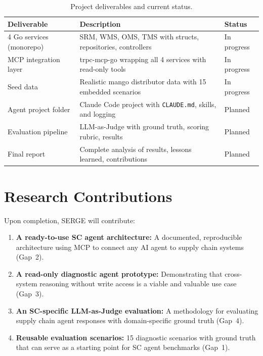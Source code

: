\documentclass[12pt,a4paper]{report}
\begin{document}
\begin{table}[H]
\centering\small
\caption{Project deliverables and current status.}
\begin{tabularx}{\textwidth}{@{} l X l @{}}
\toprule
\textbf{Deliverable} & \textbf{Description} & \textbf{Status} \\
\midrule
4 Go services (monorepo)  & SRM, WMS, OMS, TMS with structs, repositories, controllers & In progress \\
MCP integration layer      & trpc-mcp-go wrapping all 4 services with read-only tools   & In progress \\
Seed data                  & Realistic mango distributor data with 15 embedded scenarios & In progress \\
Agent project folder       & Claude Code project with \texttt{CLAUDE.md}, skills, and logging & Planned \\
Evaluation pipeline        & LLM-as-Judge with ground truth, scoring rubric, results     & Planned \\
Final report               & Complete analysis of results, lessons learned, contributions & Planned \\
\bottomrule
\end{tabularx}
\end{table}

\section{Research Contributions}

Upon completion, SERGE will contribute:

\begin{enumerate}[itemsep=0.3em]
    \item \textbf{A ready-to-use SC agent architecture:} A documented, reproducible architecture using MCP to connect any AI agent to supply chain systems (Gap~2).
    \item \textbf{A read-only diagnostic agent prototype:} Demonstrating that cross-system reasoning without write access is a viable and valuable use case (Gap~3).
    \item \textbf{An SC-specific LLM-as-Judge evaluation:} A methodology for evaluating supply chain agent responses with domain-specific ground truth (Gap~4).
    \item \textbf{Reusable evaluation scenarios:} 15 diagnostic scenarios with ground truth that can serve as a starting point for SC agent benchmarks (Gap~1).
\end{enumerate}
\end{document}
